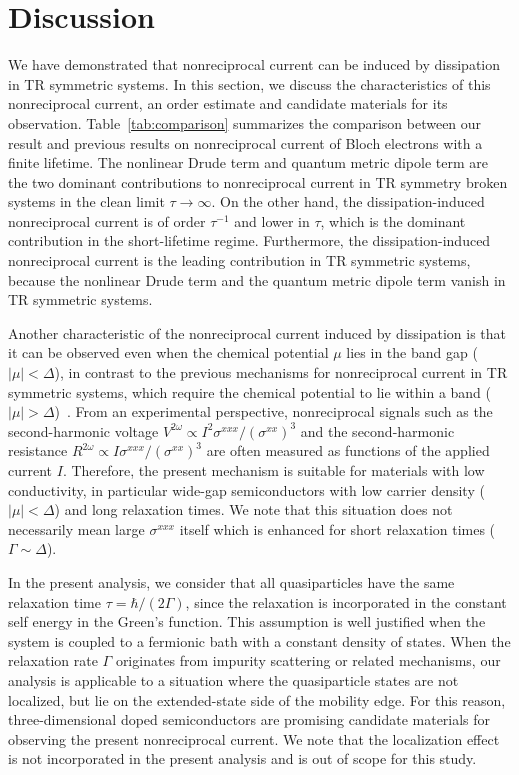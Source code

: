 \documentclass[twocolumn,superscriptaddress]{revtex4-1}
\begin{document}
\section{Discussion}
We have demonstrated that nonreciprocal current can be induced by dissipation in TR symmetric systems.
In this section, we discuss the characteristics of this nonreciprocal current, an order estimate and candidate materials for its observation.
Table~\ref{tab:comparison} summarizes the comparison between our result and previous results on nonreciprocal current of Bloch electrons with a finite lifetime.
The nonlinear Drude term and quantum metric dipole term are the two dominant contributions to nonreciprocal current in TR symmetry broken systems in the clean limit $\tau \to \infty$.
On the other hand, the dissipation-induced nonreciprocal current is of order $\tau^{-1}$ and lower in $\tau$, which is the dominant contribution in the short-lifetime regime.
Furthermore, the dissipation-induced nonreciprocal current is the leading contribution in TR symmetric systems, because the nonlinear Drude term and the quantum metric dipole term vanish in TR symmetric systems.

Another characteristic of the nonreciprocal current induced by dissipation is that it can be observed even when the chemical potential $\mu$ lies in the band gap ($|\mu|<\Delta$), in contrast to the previous mechanisms for nonreciprocal current in TR symmetric systems, which require the chemical potential to lie within a band ($|\mu|>\Delta$)~\cite{Morimoto2018,Isobe2020,Varshney2026}.
From an experimental perspective, nonreciprocal signals such as the second-harmonic voltage $V^{2\omega}\propto I^2\sigma^{xxx}/(\sigma^{xx})^3$ and the second-harmonic resistance $R^{2\omega} \propto I\sigma^{xxx}/(\sigma^{xx})^3$ are often measured as functions of the applied current $I$. 
Therefore, the present mechanism is suitable for materials with low conductivity, in particular wide-gap semiconductors with low carrier density ($|\mu|<\Delta$) and long relaxation times. 
We note that this situation does not necessarily mean large $\sigma^{xxx}$ itself which is enhanced for short relaxation times ($\Gamma \sim \Delta$).

In the present analysis, we consider that all quasiparticles have the same relaxation time $\tau=\hbar/(2\Gamma)$, since the relaxation is incorporated in the constant self energy in the Green's function. 
This assumption is well justified when the system is coupled to a fermionic bath with a constant density of states.
When the relaxation rate $\Gamma$ originates from impurity scattering or related mechanisms, our analysis is applicable to a situation where the quasiparticle states are not localized, but lie on the extended-state side of the mobility edge.
For this reason, three-dimensional doped semiconductors are promising candidate materials for observing the present nonreciprocal current.
We note that the localization effect is not incorporated in the present analysis and is out of scope for this study.
\end{document}
